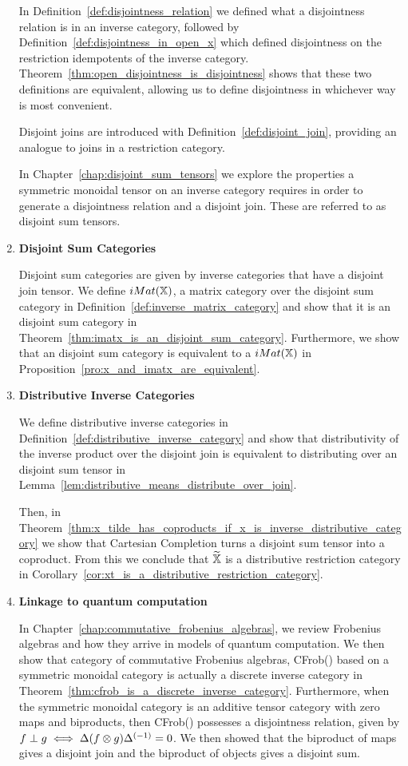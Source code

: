 \begin{enumerate}
In Definition~\ref{def:disjointness_relation} we defined what a disjointness relation is in an
inverse category, followed by Definition~\ref{def:disjointness_in_open_x} which defined disjointness
on the restriction idempotents of the inverse
category. Theorem~\ref{thm:open_disjointness_is_disjointness} shows that these two definitions are
equivalent, allowing us to define disjointness in whichever way is most convenient.

Disjoint joins are introduced with Definition~\ref{def:disjoint_join}, providing an analogue to
joins in a restriction category.

In Chapter~\ref{chap:disjoint_sum_tensors} we explore the properties a symmetric monoidal tensor
on an inverse category requires in order to generate a disjointness relation and a disjoint
join. These are referred to as disjoint sum tensors.

\item \textbf{Disjoint Sum Categories}

Disjoint sum categories are given by inverse categories that have a disjoint join tensor. We define
$iMat({\mathbb{X}})$, a matrix category over the disjoint sum category \X in
Definition~\ref{def:inverse_matrix_category} and show that it is an disjoint sum category in
Theorem~\ref{thm:imatx_is_an_disjoint_sum_category}. Furthermore, we show
that an disjoint sum category \X is equivalent to a $iMat({\mathbb{X}})$ in
Proposition~\ref{pro:x_and_imatx_are_equivalent}.


\item \textbf{Distributive Inverse Categories}

We define distributive inverse categories in Definition~\ref{def:distributive_inverse_category} and
show that distributivity of the inverse product over the disjoint join is equivalent to distributing
over an disjoint sum tensor in Lemma~\ref{lem:distributive_means_distribute_over_join}.

Then, in Theorem~\ref{thm:x_tilde_has_coproducts_if_x_is_inverse_distributive_category} we show that
Cartesian Completion turns a disjoint sum tensor into a coproduct. From this we conclude that $\widetilde{\mathbb{X}}$
is a distributive restriction category in
Corollary~\ref{cor:xt_is_a_distributive_restriction_category}.

\item \textbf{Linkage to quantum computation}

In Chapter~\ref{chap:commutative_frobenius_algebras}, we review Frobenius algebras and how they
arrive in models of quantum computation. We then show that category of commutative Frobenius
algebras, CFrob(\X) based on a symmetric monoidal category \X is actually a discrete inverse category in
Theorem~\ref{thm:cfrob_is_a_discrete_inverse_category}. Furthermore, when the symmetric monoidal
category \X is an additive tensor category with zero maps and biproducts, then CFrob(\X) possesses a
disjointness relation, given by  $f\perp g \iff \Delta(f\otimes g){\Delta}^{(-1)} = 0$. We then showed that
the biproduct of maps gives a  disjoint join and the biproduct of objects gives a disjoint sum.


\end{enumerate}
